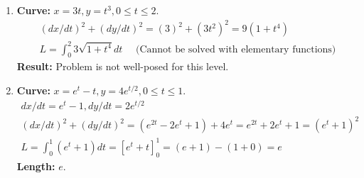 \documentclass[12pt]{article}
\begin{document}
\begin{enumerate}
    \item \textbf{Curve:} $x=3t, y=t^3, 0 \le t \le 2$.
    \begin{align*}
        (dx/dt)^2+(dy/dt)^2 = (3)^2+(3t^2)^2 = 9(1+t^4) \\
        L = \int_0^2 3\sqrt{1+t^4} dt \quad \text{ (Cannot be solved with elementary functions)}
    \end{align*}
    \textbf{Result:} Problem is not well-posed for this level.
    
    \item \textbf{Curve:} $x=e^t-t, y=4e^{t/2}, 0 \le t \le 1$.
    \begin{align*}
        dx/dt = e^t-1, dy/dt = 2e^{t/2} \\
        (dx/dt)^2+(dy/dt)^2 = (e^{2t}-2e^t+1) + 4e^t = e^{2t}+2e^t+1 = (e^t+1)^2 \\
        L = \int_0^1 (e^t+1) dt = [e^t+t]_0^1 = (e+1)-(1+0)=e
    \end{align*}
    \textbf{Length:} $e$.
\end{enumerate}
\end{document}

